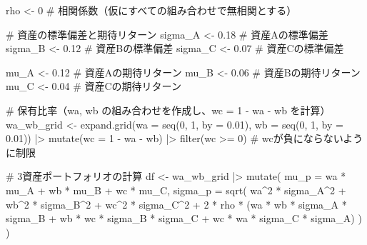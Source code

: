 \documentclass[
  letterpaper,
  pandoc,
  ja=standard,
  jafont = hiragino-pron]{ltjsbook}
\newenvironment{Shaded}{\begin{snugshade}}{\end{snugshade}}
\newcommand{\AttributeTok}[1]{\textcolor[rgb]{0.40,0.45,0.13}{#1}}
\newcommand{\CommentTok}[1]{\textcolor[rgb]{0.37,0.37,0.37}{#1}}
\newcommand{\DecValTok}[1]{\textcolor[rgb]{0.68,0.00,0.00}{#1}}
\newcommand{\FloatTok}[1]{\textcolor[rgb]{0.68,0.00,0.00}{#1}}
\newcommand{\FunctionTok}[1]{\textcolor[rgb]{0.28,0.35,0.67}{#1}}
\newcommand{\NormalTok}[1]{\textcolor[rgb]{0.00,0.23,0.31}{#1}}
\newcommand{\OtherTok}[1]{\textcolor[rgb]{0.00,0.23,0.31}{#1}}
\newcommand{\SpecialCharTok}[1]{\textcolor[rgb]{0.37,0.37,0.37}{#1}}
\begin{document}
\begin{Shaded}
\begin{Highlighting}[]
\NormalTok{rho }\OtherTok{\textless{}{-}} \DecValTok{0}  \CommentTok{\# 相関係数（仮にすべての組み合わせで無相関とする）}

\CommentTok{\# 資産の標準偏差と期待リターン}
\NormalTok{sigma\_A }\OtherTok{\textless{}{-}} \FloatTok{0.18}  \CommentTok{\# 資産Aの標準偏差}
\NormalTok{sigma\_B }\OtherTok{\textless{}{-}} \FloatTok{0.12}  \CommentTok{\# 資産Bの標準偏差}
\NormalTok{sigma\_C }\OtherTok{\textless{}{-}} \FloatTok{0.07}  \CommentTok{\# 資産Cの標準偏差}

\NormalTok{mu\_A }\OtherTok{\textless{}{-}} \FloatTok{0.12}     \CommentTok{\# 資産Aの期待リターン}
\NormalTok{mu\_B }\OtherTok{\textless{}{-}} \FloatTok{0.06}     \CommentTok{\# 資産Bの期待リターン}
\NormalTok{mu\_C }\OtherTok{\textless{}{-}} \FloatTok{0.04}     \CommentTok{\# 資産Cの期待リターン}

\CommentTok{\# 保有比率（wa, wb の組み合わせを作成し、wc = 1 {-} wa {-} wb を計算）}
\NormalTok{wa\_wb\_grid }\OtherTok{\textless{}{-}} \FunctionTok{expand.grid}\NormalTok{(}\AttributeTok{wa =} \FunctionTok{seq}\NormalTok{(}\DecValTok{0}\NormalTok{, }\DecValTok{1}\NormalTok{, }\AttributeTok{by =} \FloatTok{0.01}\NormalTok{), }\AttributeTok{wb =} \FunctionTok{seq}\NormalTok{(}\DecValTok{0}\NormalTok{, }\DecValTok{1}\NormalTok{, }\AttributeTok{by =} \FloatTok{0.01}\NormalTok{)) }\SpecialCharTok{|\textgreater{}}
  \FunctionTok{mutate}\NormalTok{(}\AttributeTok{wc =} \DecValTok{1} \SpecialCharTok{{-}}\NormalTok{ wa }\SpecialCharTok{{-}}\NormalTok{ wb) }\SpecialCharTok{|\textgreater{}}
  \FunctionTok{filter}\NormalTok{(wc }\SpecialCharTok{\textgreater{}=} \DecValTok{0}\NormalTok{)  }\CommentTok{\# wcが負にならないように制限}

\CommentTok{\# 3資産ポートフォリオの計算}
\NormalTok{df }\OtherTok{\textless{}{-}}\NormalTok{ wa\_wb\_grid }\SpecialCharTok{|\textgreater{}}
  \FunctionTok{mutate}\NormalTok{(}
    \AttributeTok{mu\_p =}\NormalTok{ wa }\SpecialCharTok{*}\NormalTok{ mu\_A }\SpecialCharTok{+}\NormalTok{ wb }\SpecialCharTok{*}\NormalTok{ mu\_B }\SpecialCharTok{+}\NormalTok{ wc }\SpecialCharTok{*}\NormalTok{ mu\_C,}
    \AttributeTok{sigma\_p =} \FunctionTok{sqrt}\NormalTok{(}
\NormalTok{      wa}\SpecialCharTok{\^{}}\DecValTok{2} \SpecialCharTok{*}\NormalTok{ sigma\_A}\SpecialCharTok{\^{}}\DecValTok{2} \SpecialCharTok{+}\NormalTok{ wb}\SpecialCharTok{\^{}}\DecValTok{2} \SpecialCharTok{*}\NormalTok{ sigma\_B}\SpecialCharTok{\^{}}\DecValTok{2} \SpecialCharTok{+}\NormalTok{ wc}\SpecialCharTok{\^{}}\DecValTok{2} \SpecialCharTok{*}\NormalTok{ sigma\_C}\SpecialCharTok{\^{}}\DecValTok{2} \SpecialCharTok{+}
      \DecValTok{2} \SpecialCharTok{*}\NormalTok{ rho }\SpecialCharTok{*}\NormalTok{ (wa }\SpecialCharTok{*}\NormalTok{ wb }\SpecialCharTok{*}\NormalTok{ sigma\_A }\SpecialCharTok{*}\NormalTok{ sigma\_B }\SpecialCharTok{+}\NormalTok{ wb }\SpecialCharTok{*}\NormalTok{ wc }\SpecialCharTok{*}\NormalTok{ sigma\_B }\SpecialCharTok{*}\NormalTok{ sigma\_C }\SpecialCharTok{+}\NormalTok{ wc }\SpecialCharTok{*}\NormalTok{ wa }\SpecialCharTok{*}\NormalTok{ sigma\_C }\SpecialCharTok{*}\NormalTok{ sigma\_A)}
\NormalTok{    )}
\NormalTok{  )}


\end{Highlighting}
\end{Shaded}
\end{document}
